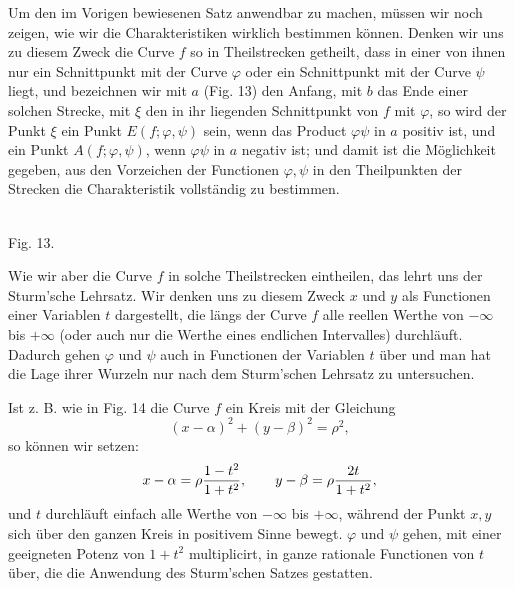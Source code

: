 \documentclass[11pt]{article}
\begin{document}
Um den im Vorigen bewiesenen Satz anwendbar zu machen, müssen wir noch zeigen, wie wir die Charakteristiken wirklich bestimmen können. Denken wir uns zu diesem Zweck die Curve $f$ so in Theilstrecken getheilt, dass in einer von ihnen nur ein Schnittpunkt mit der Curve $\varphi$ oder ein Schnittpunkt mit der Curve $\psi$ liegt, und bezeichnen wir mit $a$ (Fig. 13) den Anfang, mit $b$ das Ende einer solchen Strecke, mit $\xi$ den in ihr liegenden Schnittpunkt von $f$ mit $\varphi$, so wird der Punkt $\xi$ ein Punkt $E(f;\varphi,\psi)$ sein, wenn das Product $\varphi\psi$ in $a$ positiv ist, und ein Punkt $A(f;\varphi,\psi)$, wenn $\varphi\psi$ in $a$ negativ ist; und damit ist die Möglichkeit gegeben, aus den Vorzeichen der Functionen $\varphi,\psi$ in den Theilpunkten der Strecken die Charakteristik vollständig zu bestimmen.


\begin{center}
\\[-0.2em]
{\small Fig. 13.}
\end{center}


Wie wir aber die Curve $f$ in solche Theilstrecken eintheilen, das lehrt uns der Sturm'sche Lehrsatz. Wir denken uns zu diesem Zweck $x$ und $y$ als Functionen einer Variablen $t$ dargestellt, die längs der Curve $f$ alle reellen Werthe von $-\infty$ bis $+\infty$ (oder auch nur die Werthe eines endlichen Intervalles) durchläuft. Dadurch gehen $\varphi$ und $\psi$ auch in Functionen der Variablen $t$ über und man hat die Lage ihrer Wurzeln nur nach dem Sturm'schen Lehrsatz zu untersuchen.

Ist z. B. wie in Fig. 14 die Curve $f$ ein Kreis mit der Gleichung
\[
        (x-\alpha)^2+(y-\beta)^2=\rho^2,
\]
so können wir setzen:
\[
        x-\alpha=\rho{1-t^2\over 1+t^2},
        \qquad
        y-\beta=\rho{2t\over 1+t^2},
\]
und $t$ durchläuft einfach alle Werthe von $-\infty$ bis $+\infty$, während der Punkt $x,y$ sich über den ganzen Kreis in positivem Sinne bewegt. $\varphi$ und $\psi$ gehen, mit einer geeigneten Potenz von $1+t^2$ multiplicirt, in ganze rationale Functionen von $t$ über, die die Anwendung des Sturm'schen Satzes gestatten.
\end{document}
